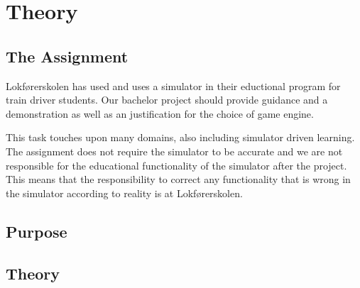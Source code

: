\chapter{Theory}

\section{The Assignment}
Lokførerskolen has used and uses a simulator in their eductional program for train driver students. Our bachelor project should provide guidance and a demonstration as well as an justification for the choice of game engine.

This task touches upon many domains, also including simulator driven learning. The assignment does not require the simulator to be accurate and we are not responsible for the educational functionality of the simulator after the project. This means that the responsibility to correct any functionality that is wrong in the simulator according to reality is at Lokførerskolen. 





\section{Purpose}

\section{Theory}
